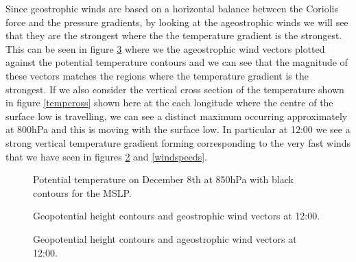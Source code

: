 \documentclass[12pt,a4paper]{article}
\begin{document}
Since geostrophic winds are based on a horizontal balance between the Coriolis force and the pressure gradients, by looking at the ageostrophic winds we will see that they are the strongest where the the temperature gradient is the strongest. This can be seen in figure \ref{ageostrophic wind} where we the ageostrophic wind vectors plotted against the potential temperature contours and we can see that the magnitude of these vectors matches the regions where the temperature gradient is the strongest. If we also consider the vertical cross section of the temperature shown in figure \ref{tempcross} shown here at the each longitude where the centre of the surface low is travelling, we can see a distinct maximum occurring approximately at 800hPa and this is moving with the surface low. In particular at 12:00 we see a strong vertical temperature gradient forming corresponding to the very fast winds that we have seen in figures \ref{geostrophic wind} and \ref{windspeeds}.
\begin{figure}[H]
    \centering
        \centering
        \caption{Potential temperature on December 8th at 850hPa with black contours for the MSLP.}
        \label{potential temperature}
\end{figure}
\begin{figure}[H]
    \centering
        \centering
        \caption{Geopotential height contours and geostrophic wind vectors at 12:00.}
        \label{geostrophic wind}
\end{figure}
\begin{figure}[H]
    \centering
        \centering
        \caption{Geopotential height contours and ageostrophic wind vectors at 12:00.}
        \label{ageostrophic wind}
\end{figure}
\end{document}
